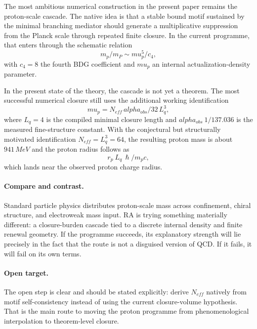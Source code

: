 \documentclass[11pt]{article}
\DeclareRobustCommand{\hbar}{\ensuremath{\hslash}}
\def\mu{mu}%
\def\alpha{alpha}%
\def\mathrm#1{#1}%
\def\frac#1#2{#1/#2}%
\def\approx{~}%
\begin{document}
The most ambitious numerical construction in the present paper remains the proton-scale cascade. The native idea is that a stable bound motif sustained by the minimal branching mediator should generate a multiplicative suppression from the Planck scale through repeated finite closure. In the current programme, that enters through the schematic relation
\begin{equation}
\frac{m_p}{m_P} \sim \frac{\mu_p^5}{c_4},
\end{equation}
with $c_4=8$ the fourth BDG coefficient and $\mu_p$ an internal actualization-density parameter.

In the present state of the theory, the cascade is not yet a theorem. The most successful numerical closure still uses the additional working identification
\begin{equation}
\mu_p = \frac{N_{\mathrm{eff}}\,\alpha_{\mathrm{obs}}}{32\,L_q^3},
\end{equation}
where $L_q=4$ is the compiled minimal closure length and $\alpha_{\mathrm{obs}}\approx 1/137.036$ is the measured fine-structure constant. With the conjectural but structurally motivated identification $N_{\mathrm{eff}}=L_q^3=64$, the resulting proton mass is about $941\,\mathrm{MeV}$ and the proton radius follows as
\begin{equation}
 r_p \approx L_q\,\frac{\hbar}{m_p c},
\end{equation}
which lands near the observed proton charge radius.

\paragraph{Compare and contrast.} Standard particle physics distributes proton-scale mass across confinement, chiral structure, and electroweak mass input. RA is trying something materially different: a closure-burden cascade tied to a discrete internal density and finite renewal geometry. If the programme succeeds, its explanatory strength will lie precisely in the fact that the route is not a disguised version of QCD. If it fails, it will fail on its own terms.

\paragraph{Open target.} The open step is clear and should be stated explicitly: derive $N_{\mathrm{eff}}$ natively from motif self-consistency instead of using the current closure-volume hypothesis. That is the main route to moving the proton programme from phenomenological interpolation to theorem-level closure.
\end{document}
